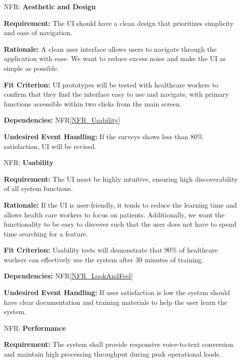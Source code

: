 \documentclass[12pt]{article}
\newcounter{nfrnum} %
\begin{document}
\noindent \begin{itemize}

\item[NFR\refstepcounter{nfrnum}\thenfrnum \label{NFR_LookAndFeel}:] \textbf{Aesthetic and Design}

    \textbf{Requirement:} The UI should have a clean design that prioritizes simplicity and ease of navigation.

    \textbf{Rationale:} A clean user interface allows users to navigate through the application with ease. We want to reduce excess noise and make the UI as simple as possible.

    \textbf{Fit Criterion:} UI prototypes will be tested with healthcare workers to confirm that they find the interface easy to use and navigate, with primary functions accessible within two clicks from the main screen.

    \textbf{Dependencies:} NFR\ref{NFR_Usability}

    \textbf{Undesired Event Handling:} If the surveys shows less than 80\% satisfaction, UI will be revised.


\item[NFR\refstepcounter{nfrnum}\thenfrnum \label{NFR_Usability}:] \textbf{Usability}

    \textbf{Requirement:} The UI must be highly intuitive, ensuring high discoverability of all system functions.

    \textbf{Rationale:} If the UI is user-friendly, it tends to reduce the learning time and allows health care workers to focus on patients. Additionally, we want the functionality to be easy to discover such that the user does not have to spend time searching for a feature.
  
    \textbf{Fit Criterion:} Usability tests will demonstrate that 90\% of healthcare workers can effectively use the system after 30 minutes of training.

    \textbf{Dependencies:} NFR\ref{NFR_LookAndFeel}

    \textbf{Undesired Event Handling:} If user satisfaction is low the system should have clear documentation and training materials to help the user learn the system.

\item[NFR\refstepcounter{nfrnum}\thenfrnum \label{NFR_Performance}:] \textbf{Performance}

    \textbf{Requirement:} The system shall provide responsive voice-to-text conversion and maintain high processing throughput during peak operational loads.


\end{itemize}
\end{document}
